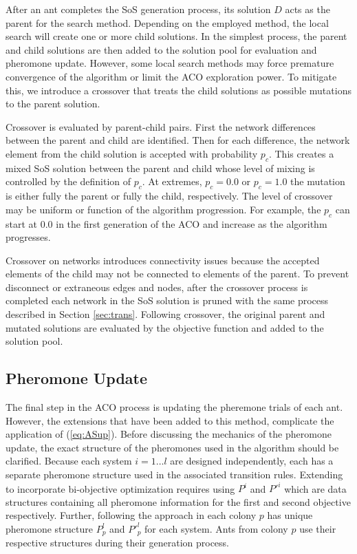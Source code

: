 \documentclass[preprint,12pt]{elsarticle}
\begin{document}
After an ant completes the SoS generation process, its solution $D$ acts as the parent for the search method. Depending on the employed method, the local search will create one or more child solutions. In the simplest process, the parent and child solutions are then added to the solution pool for evaluation and pheromone update. However, some local search methods may force premature convergence of the algorithm or limit the ACO exploration power. To mitigate this, we introduce a crossover that treats the child solutions as possible mutations to the parent solution.

Crossover is evaluated by parent-child pairs. First the network differences between the parent and child are identified. Then for each difference, the network element from the child solution is accepted with probability $p_c$. This creates a mixed SoS solution between the parent and child whose level of mixing is controlled by the definition of $p_c$. At extremes, $p_c=0.0$ or $p_c=1.0$ the mutation is either fully the parent or fully the child, respectively. The level of crossover may be uniform or function of the algorithm progression. For example, the $p_c$ can start at $0.0$ in the first generation of the ACO and increase as the algorithm progresses.

Crossover on networks introduces connectivity issues because the accepted elements of the child may not be connected to elements of the parent. To prevent disconnect or extraneous edges and nodes, after the crossover process is completed each network in the SoS solution is pruned with the same process described in Section \ref{sec:trans}. Following crossover, the original parent and mutated solutions are evaluated by the objective function and added to the solution pool.


\subsection{Pheromone Update}
The final step in the ACO process is updating the pheremone trials of each ant. However, the extensions that have been added to this method, complicate the application of (\ref{eq:ASup}). Before discussing the mechanics of the pheromone update, the exact structure of the pheromones used in the algorithm should be clarified. Because each system $i=1\ldots l$ are designed independently, each has a separate pheromone structure used in the associated transition rules. Extending to incorporate bi-objective optimization requires using $P^i$ and $P'^{i}$ which are data structures containing all pheromone information for the first and second objective respectively. Further, following the approach in \cite{Iredi2001} each colony $p$ has unique pheromone structure $P^l_p$ and $P'^{l}_p$ for each system. Ants from colony $p$ use their respective structures during their generation process.  
\end{document}
